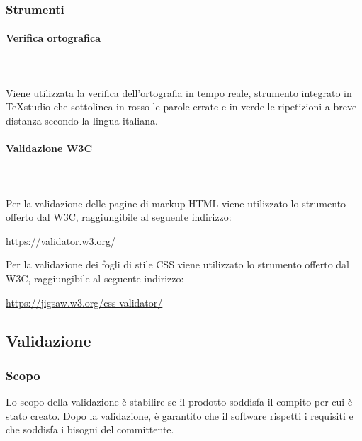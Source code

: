 	\subsubsection{Strumenti}
		\paragraph{Verifica ortografica} \mbox{}\\ \mbox{}\\
		Viene utilizzata la verifica dell'ortografia in tempo reale, strumento integrato in \TeX{}studio che sottolinea in rosso le parole errate e in verde le ripetizioni a breve distanza secondo la lingua italiana.
		\paragraph{Validazione W3C} \mbox{}\\ \mbox{}\\
		Per la validazione delle pagine di markup HTML viene utilizzato lo strumento offerto dal W3C, raggiungibile al seguente indirizzo: \newline
		\centerline{\url{https://validator.w3.org/}} \newline \newline
		Per la validazione dei fogli di stile CSS viene utilizzato lo strumento offerto dal W3C, raggiungibile al seguente indirizzo: \newline
		\centerline{\url{https://jigsaw.w3.org/css-validator/}} \newline

\subsection{Validazione}
	\subsubsection{Scopo}
	Lo scopo della validazione è stabilire se il prodotto soddisfa il compito per cui è stato creato. Dopo la validazione, è garantito che il software rispetti i requisiti e che soddisfa i bisogni del committente.

